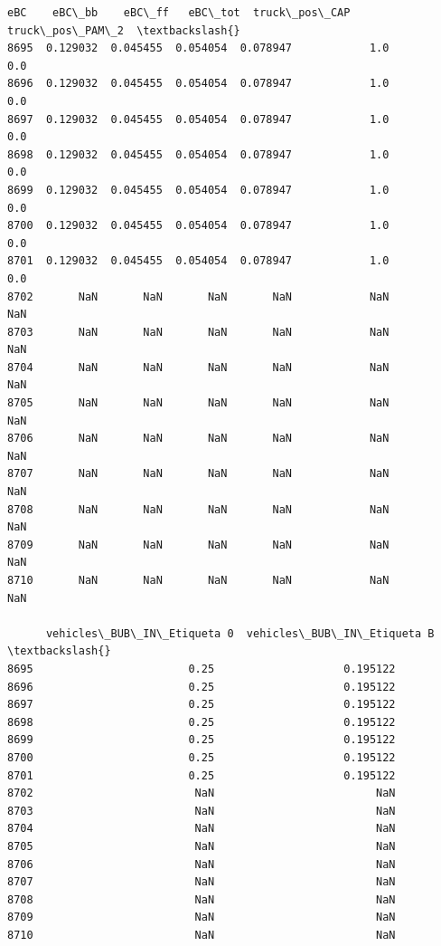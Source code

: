\documentclass[11pt]{article}
\begin{document}
\begin{tcolorbox}[breakable, size=fbox, boxrule=.5pt, pad at break*=1mm, opacityfill=0]
\begin{Verbatim}[commandchars=\\\{\}]
           eBC    eBC\_bb    eBC\_ff   eBC\_tot  truck\_pos\_CAP  truck\_pos\_PAM\_2  \textbackslash{}
8695  0.129032  0.045455  0.054054  0.078947            1.0              0.0
8696  0.129032  0.045455  0.054054  0.078947            1.0              0.0
8697  0.129032  0.045455  0.054054  0.078947            1.0              0.0
8698  0.129032  0.045455  0.054054  0.078947            1.0              0.0
8699  0.129032  0.045455  0.054054  0.078947            1.0              0.0
8700  0.129032  0.045455  0.054054  0.078947            1.0              0.0
8701  0.129032  0.045455  0.054054  0.078947            1.0              0.0
8702       NaN       NaN       NaN       NaN            NaN              NaN
8703       NaN       NaN       NaN       NaN            NaN              NaN
8704       NaN       NaN       NaN       NaN            NaN              NaN
8705       NaN       NaN       NaN       NaN            NaN              NaN
8706       NaN       NaN       NaN       NaN            NaN              NaN
8707       NaN       NaN       NaN       NaN            NaN              NaN
8708       NaN       NaN       NaN       NaN            NaN              NaN
8709       NaN       NaN       NaN       NaN            NaN              NaN
8710       NaN       NaN       NaN       NaN            NaN              NaN

      vehicles\_BUB\_IN\_Etiqueta 0  vehicles\_BUB\_IN\_Etiqueta B  \textbackslash{}
8695                        0.25                    0.195122
8696                        0.25                    0.195122
8697                        0.25                    0.195122
8698                        0.25                    0.195122
8699                        0.25                    0.195122
8700                        0.25                    0.195122
8701                        0.25                    0.195122
8702                         NaN                         NaN
8703                         NaN                         NaN
8704                         NaN                         NaN
8705                         NaN                         NaN
8706                         NaN                         NaN
8707                         NaN                         NaN
8708                         NaN                         NaN
8709                         NaN                         NaN
8710                         NaN                         NaN


\end{Verbatim}
\end{tcolorbox}
\end{document}
